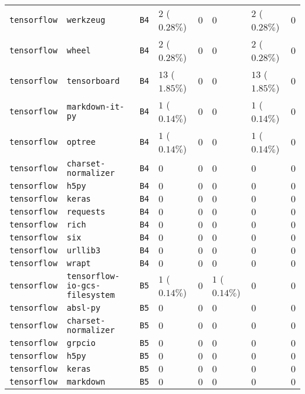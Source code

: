 \begin{table}
\begin{tabular}{llllllll}
\texttt{tensorflow} & \texttt{werkzeug} & \texttt{B4} & $2$ ($0.28\%$) & $0$ & $0$ & $2$ ($0.28\%$) & $0$ \\
\texttt{tensorflow} & \texttt{wheel} & \texttt{B4} & $2$ ($0.28\%$) & $0$ & $0$ & $2$ ($0.28\%$) & $0$ \\
\texttt{tensorflow} & \texttt{tensorboard} & \texttt{B4} & $13$ ($1.85\%$) & $0$ & $0$ & $13$ ($1.85\%$) & $0$ \\
\texttt{tensorflow} & \texttt{markdown-it-py} & \texttt{B4} & $1$ ($0.14\%$) & $0$ & $0$ & $1$ ($0.14\%$) & $0$ \\
\texttt{tensorflow} & \texttt{optree} & \texttt{B4} & $1$ ($0.14\%$) & $0$ & $0$ & $1$ ($0.14\%$) & $0$ \\
\texttt{tensorflow} & \texttt{charset-normalizer} & \texttt{B4} & $0$ & $0$ & $0$ & $0$ & $0$ \\
\texttt{tensorflow} & \texttt{h5py} & \texttt{B4} & $0$ & $0$ & $0$ & $0$ & $0$ \\
\texttt{tensorflow} & \texttt{keras} & \texttt{B4} & $0$ & $0$ & $0$ & $0$ & $0$ \\
\texttt{tensorflow} & \texttt{requests} & \texttt{B4} & $0$ & $0$ & $0$ & $0$ & $0$ \\
\texttt{tensorflow} & \texttt{rich} & \texttt{B4} & $0$ & $0$ & $0$ & $0$ & $0$ \\
\texttt{tensorflow} & \texttt{six} & \texttt{B4} & $0$ & $0$ & $0$ & $0$ & $0$ \\
\texttt{tensorflow} & \texttt{urllib3} & \texttt{B4} & $0$ & $0$ & $0$ & $0$ & $0$ \\
\texttt{tensorflow} & \texttt{wrapt} & \texttt{B4} & $0$ & $0$ & $0$ & $0$ & $0$ \\
\texttt{tensorflow} & \texttt{tensorflow-io-gcs-filesystem} & \texttt{B5} & $1$ ($0.14\%$) & $0$ & $1$ ($0.14\%$) & $0$ & $0$ \\
\texttt{tensorflow} & \texttt{absl-py} & \texttt{B5} & $0$ & $0$ & $0$ & $0$ & $0$ \\
\texttt{tensorflow} & \texttt{charset-normalizer} & \texttt{B5} & $0$ & $0$ & $0$ & $0$ & $0$ \\
\texttt{tensorflow} & \texttt{grpcio} & \texttt{B5} & $0$ & $0$ & $0$ & $0$ & $0$ \\
\texttt{tensorflow} & \texttt{h5py} & \texttt{B5} & $0$ & $0$ & $0$ & $0$ & $0$ \\
\texttt{tensorflow} & \texttt{keras} & \texttt{B5} & $0$ & $0$ & $0$ & $0$ & $0$ \\
\texttt{tensorflow} & \texttt{markdown} & \texttt{B5} & $0$ & $0$ & $0$ & $0$ & $0$ \\

\end{tabular}
\end{table}
